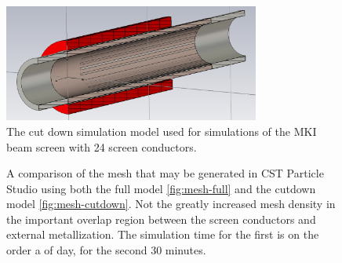 \begin{figure}
\begin{center}
\includegraphics[width=0.75\textwidth]{LHC_MKI/figures/cutDownModel.png}
\end{center}
\caption{The cut down simulation model used for simulations of the MKI beam screen with 24 screen conductors.}
\label{fig:cut-down-mki-cap-end}
\end{figure}

\begin{figure}
\caption{A comparison of the mesh that may be generated in CST Particle Studio using both the full model \ref{fig:mesh-full} and the cutdown model \ref{fig:mesh-cutdown}. Not the greatly increased mesh density in the important overlap region between the screen conductors and external metallization. The simulation time for the first is on the order a of day, for the second 30 minutes.}
\label{fig:mki-mesh-com-cst}
\end{figure}

